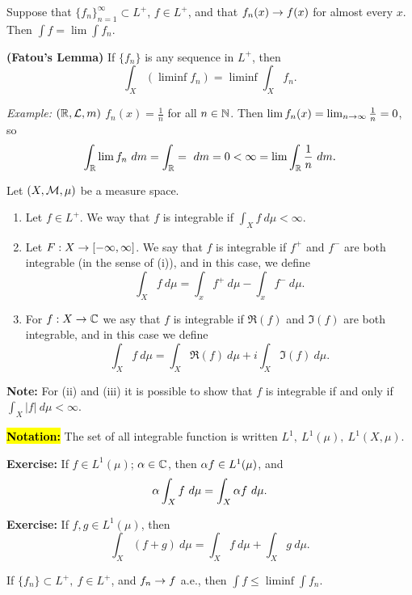 \vs

\begin{cor}
Suppose that $\{f_n\}_{n = 1}^\infty\subset L^+$, $f\in L^+$, and that $f_n(x) \rightarrow f(x)$ for almost every $x$. Then $\int f = \lim\int f_n$.
\end{cor}

\vs

\begin{thm}\textbf{(Fatou's Lemma)}
If $\{f_n\}$ is any sequence in $L^+$, then
\[\int_X(\liminf f_n) = \liminf\int_X f_n.\]
\end{thm}

\textit{Example:} $(\mathbb{R}, \mathcal{L}, m)$ $f_n(x) = \frac{1}{n}$ for all $n\in \mathbb{N}$. Then $\lim f_n(x) = \lim_{n\rightarrow \infty} \frac{1}{n} = 0$, so 
\[\int_\R \lim f_n\ dm = \int_\R = \ dm = 0 < \infty = \lim \int_\R \frac{1}{n}\ dm.\]


\dfn Let $(X, \mathcal{M}, \mu)$ be a measure space.
\begin{enumerate}[\hspace{1em}(i)]
    \item Let $f\in L^+$. We way that $f$ is integrable if $\int_X f\ d\mu < \infty$.
    \item Let $F:X\rightarrow [-\infty, \infty]$. We say that $f$ is integrable if $f^+$ and $f^-$ are both integrable (in the sense of (i)), and in this case, we define \[\int_X f\ d\mu = \int_x f^+\ d\mu - \int_x f^-\ d\mu.\]
    \item For $f:X\rightarrow \mathbb{C}$ we asy that $f$ is integrable if $\Re(f)$ and $\Im(f)$ are both integrable, and in this case we define \[\int_X f\ d\mu = \int_X \Re(f)\ d\mu + i\int_X\Im(f)\ d\mu.\]
\end{enumerate}

\textbf{Note:} For (ii) and (iii) it is possible to show that $f$ is integrable if and only if $\int_X |f|\ d\mu < \infty$.

\hl{\textbf{Notation:}} The set of all integrable function is written $L^1,\ L^1(\mu),\ L^1(X, \mu)$.

\textbf{Exercise:} If $f\in L^1(\mu)$; $\alpha\in \mathbb{C}$, then $\alpha f\in L^1(\mu)$, and
\[\al\int_X f\ d\mu = \int_X\al f\ d\mu.\]

\textbf{Exercise:} If $f, g\in L^1(\mu)$, then 
\[\int_X (f + g)\ d\mu = \int_X f\ d\mu + \int_X g\ d\mu.\]

\vs

\begin{cor}
If $\{f_n\} \subset L^+,\ f\in L^+$, and $f_n\rightarrow f$ a.e., then $\int f \leq \liminf \int f_n$.
\end{cor}


